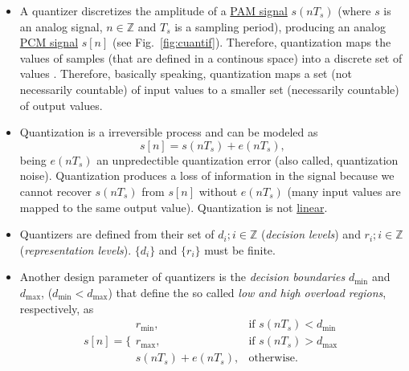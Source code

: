 \begin{itemize}
\tightlist

\item
  A quantizer discretizes the amplitude of a
  \href{https://en.wikipedia.org/wiki/Pulse-amplitude_modulation}{PAM
    signal} \(s(nT_s)\) (where $s$ is an analog signal,
  $n\in{\mathbb{Z}}$ and $T_s$ is a sampling period), producing an
  analog
  \href{https://en.wikipedia.org/wiki/Pulse-code_modulation}{PCM
    signal} $s[n]$ (see Fig.~\ref{fig:cuantif}). Therefore,
  quantization maps the values of samples (that are defined in a
  continous space) into a discrete set of values
  \cite{vetterli1995wavelets}. Therefore, basically speaking,
  quantization maps a set (not necessarily countable) of input values
  to a smaller set (necessarily countable) of output values.

\item
  Quantization is a irreversible process and can be modeled as
  \begin{equation}
    s[n] = s(nT_s) + e(nT_s),
  \end{equation}
  being \(e(nT_s)\) an unpredectible quantization error (also called,
  quantization noise). Quantization produces a loss of information in
  the signal because we cannot recover $s(nT_s)$ from $s[n]$ without
  $e(nT_s)$ (many input values are mapped to the same output
  value). Quantization is not
  \href{https://en.wikipedia.org/wiki/Linear_map}{linear}.

\item
  Quantizers are defined from their set of \(d_i; i\in {\mathbb{Z}}\)
  (\emph{decision levels}) and \(r_i; i\in {\mathbb{Z}}\)
  (\emph{representation levels}). $\{d_i\}$ and $\{r_i\}$ must be
  finite.

\item Another design parameter of quantizers is the
  \emph{decision boundaries} $d_{\text{min}}$ and $d_{\text{max}}$,
  ($d_{\text{min}}<d_{\text{max}}$) that define the so called \emph{low
    and high overload regions}, respectively, as
  \begin{equation}
    s[n] = \{\begin{array}{ll}
    r_{\text{min}}, & \text{if $s(nT_s)<d_{\text{min}}$} \\
    r_{\text{max}}, & \text{if $s(nT_s)>d_{\text{max}}$} \\
    s(nT_s)+e(nT_s), & \text{otherwise}.
    \end{array}
  \end{equation}
  

\end{itemize}
